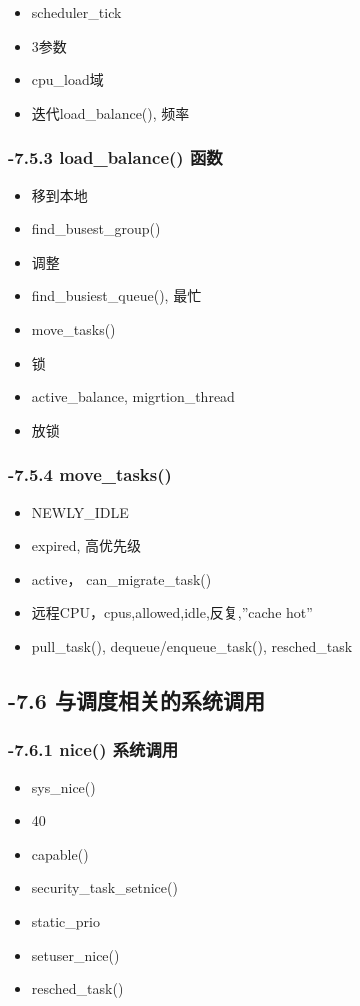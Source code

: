 \documentclass[11pt]{article}
\begin{document}
\begin{itemize}
\item scheduler\_tick
\item 3参数
\item cpu\_load域
\item 迭代load\_balance(), 频率
\end{itemize}
\subsubsection{-7.5.3 load\_balance() 函数}
\label{sec-2.5.3}

\begin{itemize}
\item 移到本地
\item find\_busest\_group()
\item 调整
\item find\_busiest\_queue(), 最忙
\item move\_tasks()
\item 锁
\item active\_balance, migrtion\_thread
\item 放锁
\end{itemize}
\subsubsection{-7.5.4 move\_tasks()}
\label{sec-2.5.4}

\begin{itemize}
\item NEWLY\_IDLE
\item expired, 高优先级
\item active， can\_migrate\_task()
\item 远程CPU，cpus,allowed,idle,反复,''cache hot''
\item pull\_task(), dequeue/enqueue\_task(), resched\_task
\end{itemize}
\subsection{-7.6 与调度相关的系统调用}
\label{sec-2.6}


\subsubsection{-7.6.1 nice() 系统调用}
\label{sec-2.6.1}

\begin{itemize}
\item sys\_nice()
\item 40
\item capable()
\item security\_task\_setnice()
\item static\_prio
\item setuser\_nice()
\item resched\_task()
\end{itemize}
\end{document}
